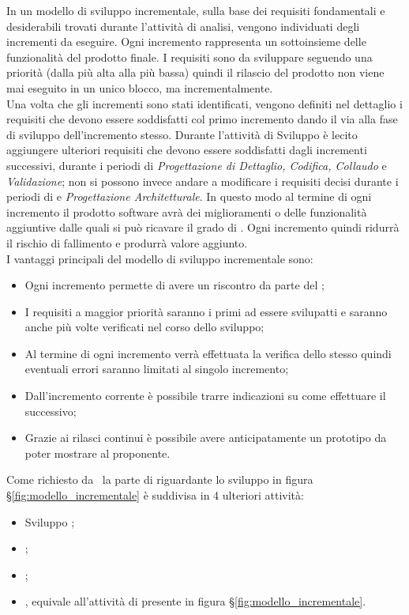 In un modello di sviluppo incrementale, sulla base dei requisiti fondamentali e desiderabili trovati durante l'attività di analisi, vengono individuati degli incrementi da eseguire. Ogni incremento rappresenta un sottoinsieme delle funzionalità del prodotto finale. I requisiti sono da sviluppare seguendo una priorità (dalla più alta alla più bassa) quindi il rilascio del prodotto non viene mai eseguito in un unico blocco, ma incrementalmente.\\
Una volta che gli incrementi sono stati identificati, vengono definiti nel dettaglio i requisiti che devono essere soddisfatti col primo incremento dando il via alla fase di sviluppo dell’incremento stesso.  Durante l’attività di Sviluppo è lecito aggiungere ulteriori requisiti che devono essere soddisfatti dagli incrementi successivi, durante i periodi di \textit{Progettazione di Dettaglio, Codifica, Collaudo} e \textit{Validazione}; non si possono invece andare a modificare i requisiti decisi durante i periodi di \textit{\AdR} e \textit{Progettazione Architetturale}. In questo modo al termine di ogni incremento il prodotto software avrà dei miglioramenti o delle funzionalità aggiuntive dalle quali si può ricavare il grado di . Ogni incremento quindi ridurrà il rischio di fallimento e produrrà valore aggiunto.\\
I vantaggi principali del modello di sviluppo incrementale sono:
\begin{itemize}
    \item Ogni incremento permette di avere un riscontro da parte del ;
    \item I requisiti a maggior priorità saranno i primi ad essere svilupatti e saranno anche più volte verificati nel corso dello sviluppo;
    \item Al termine di ogni incremento verrà effettuata la verifica dello stesso quindi eventuali errori saranno limitati al singolo incremento;
    \item Dall'incremento corrente è possibile trarre indicazioni su come effettuare il successivo;
    \item Grazie ai rilasci continui è possibile avere anticipatamente un prototipo da poter mostrare al proponente.
\end{itemize}

Come richiesto da \Proponente\ la parte di  riguardante lo sviluppo in figura \S\ref{fig:modello_incrementale} è suddivisa in 4 ulteriori attività:
\begin{itemize}
    \item Sviluppo ;
    \item {};
    \item {};
    \item {} , equivale all'attività di  presente in figura \S\ref{fig:modello_incrementale}.
\end{itemize}
